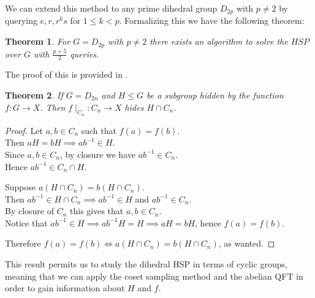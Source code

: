 \documentclass{article}
\theoremstyle{plain}
\newtheorem{theorem}{Theorem}
\theoremstyle{centered}
\begin{document}
        We can extend this method to any prime dihedral group $D_{2p}$ with $p \neq 2$ by querying $e, r, r^k s$ for $1 \leq k < p$.
        Formalizing this we have the following theorem:

        \begin{theorem}
            For $G = D_{2p}$ with $p \neq 2$ there exists an algorithm to solve the $HSP$ over $G$ with $\frac{p+5}{2}$ queries.
        \end{theorem}
        The proof of this is provided in \cite{perepechaenko}.

        \begin{theorem}
            If $G = D_{2n}$ and $H \leqslant G$ be a subgroup hidden by the function $f : G \to X$. Then $f\mid_{C_n} : C_n \to X$ hides $H \cap C_n$.
        \end{theorem}
        \begin{proof}
            Let $a, b \in C_n$ such that $f(a) = f(b)$.\\
            Then $aH = bH \implies ab^{-1} \in H$.\\
            Since $a, b \in C_n$, by closure we have $ab^{-1} \in C_n$.\\
            Hence $ab^{-1} \in C_n \cap H$.

            Suppose $a(H \cap C_n) = b(H \cap C_n)$.\\
            Then $ab^{-1} \in H \cap C_n \implies ab^{-1} \in H$ and $ab^{-1} \in C_n$.\\
            By closure of $C_n$ this gives that $a, b \in C_n$.\\
            Notice that $ab^{-1} \in H \implies ab^{-1}H = H \implies aH = bH$, hence $f(a) = f(b)$.

            Therefore $f(a) = f(b) \iff a(H \cap C_n) = b(H \cap C_n)$, as wanted.
        \end{proof}

        This result permits us to study the dihedral HSP in terms of cyclic groups, meaning that we can apply the coset sampling method and the abelian QFT in order to gain information about $H$ and $f$.

\newpage
\nocite{*}
\printbibliography
\end{document}

